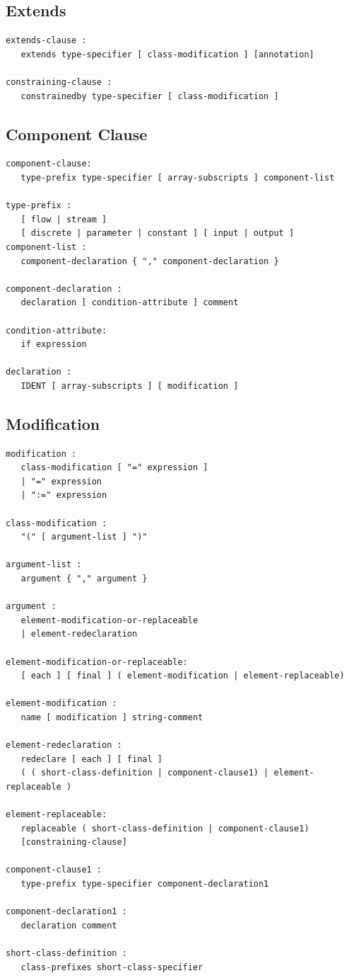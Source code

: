 \documentclass[10pt,a4paper]{report}
\def\doublelabel#1{\label{#1}}
\begin{document}
\subsection{Extends}\doublelabel{extends}
\begin{lstlisting}[language=grammar]
extends-clause :
   extends type-specifier [ class-modification ] [annotation]
   
constraining-clause :
   constrainedby type-specifier [ class-modification ]
\end{lstlisting}

\subsection{Component Clause}\doublelabel{component-clause}
\begin{lstlisting}[language=grammar]
component-clause:
   type-prefix type-specifier [ array-subscripts ] component-list
   
type-prefix :
   [ flow | stream ]
   [ discrete | parameter | constant ] [ input | output ]
component-list :
   component-declaration { "," component-declaration }

component-declaration :
   declaration [ condition-attribute ] comment

condition-attribute:
   if expression

declaration :
   IDENT [ array-subscripts ] [ modification ]
\end{lstlisting}

\subsection{Modification}\doublelabel{modification}
\begin{lstlisting}[language=grammar]
modification :
   class-modification [ "=" expression ]
   | "=" expression
   | ":=" expression
   
class-modification :
   "(" [ argument-list ] ")"
   
argument-list :
   argument { "," argument }
   
argument :
   element-modification-or-replaceable
   | element-redeclaration
   
element-modification-or-replaceable:
   [ each ] [ final ] ( element-modification | element-replaceable)
   
element-modification :
   name [ modification ] string-comment

element-redeclaration :
   redeclare [ each ] [ final ]
   ( ( short-class-definition | component-clause1) | element-replaceable )

element-replaceable:
   replaceable ( short-class-definition | component-clause1)
   [constraining-clause]
   
component-clause1 :
   type-prefix type-specifier component-declaration1
   
component-declaration1 :
   declaration comment

short-class-definition :
   class-prefixes short-class-specifier
\end{lstlisting}
\end{document}
